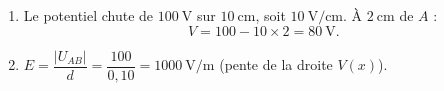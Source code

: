 \documentclass[11pt,a4paper]{article}
\begin{document}
\begin{corrige}
\begin{enumerate}[label=\alph*)]
  \item Le potentiel chute de $\SI{100}{\volt}$ sur $\SI{10}{\centi\metre}$, soit
        $\SI{10}{\volt\per\centi\metre}$. À $\SI{2}{\centi\metre}$ de $A$ :
        \[ V = 100 - 10\times 2 = \SI{80}{\volt}. \]
  \item $E = \dfrac{|U_{AB}|}{d} = \dfrac{100}{0{,}10} = \SI{1000}{\volt\per\metre}$
        (pente de la droite $V(x)$).
\end{enumerate}
\end{corrige}
\end{document}
